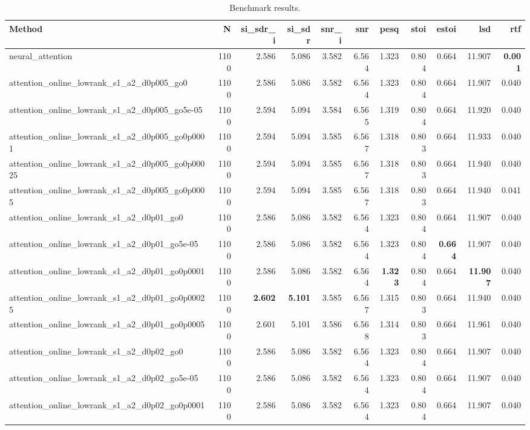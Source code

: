 \begin{table}[t]
\centering
\caption{Benchmark results.}
\label{tab:bench}
\begin{tabular}{lrrrrrrrrrr}
\toprule
Method & N & si\_sdr\_i & si\_sdr & snr\_i & snr & pesq & stoi & estoi & lsd & rtf \\
\midrule
neural_attention & 1100 & 2.586 & 5.086 & 3.582 & 6.564 & 1.323 & 0.804 & 0.664 & 11.907 & \textbf{0.001} \\
attention_online_lowrank_s1_a2_d0p005_go0 & 1100 & 2.586 & 5.086 & 3.582 & 6.564 & 1.323 & 0.804 & 0.664 & 11.907 & 0.040 \\
attention_online_lowrank_s1_a2_d0p005_go5e-05 & 1100 & 2.594 & 5.094 & 3.584 & 6.565 & 1.319 & 0.804 & 0.664 & 11.920 & 0.040 \\
attention_online_lowrank_s1_a2_d0p005_go0p0001 & 1100 & 2.594 & 5.094 & 3.585 & 6.567 & 1.318 & 0.803 & 0.664 & 11.933 & 0.040 \\
attention_online_lowrank_s1_a2_d0p005_go0p00025 & 1100 & 2.594 & 5.094 & 3.585 & 6.567 & 1.318 & 0.803 & 0.664 & 11.940 & 0.040 \\
attention_online_lowrank_s1_a2_d0p005_go0p0005 & 1100 & 2.594 & 5.094 & 3.585 & 6.567 & 1.318 & 0.803 & 0.664 & 11.940 & 0.041 \\
attention_online_lowrank_s1_a2_d0p01_go0 & 1100 & 2.586 & 5.086 & 3.582 & 6.564 & 1.323 & 0.804 & 0.664 & 11.907 & 0.040 \\
attention_online_lowrank_s1_a2_d0p01_go5e-05 & 1100 & 2.586 & 5.086 & 3.582 & 6.564 & 1.323 & 0.804 & \textbf{0.664} & 11.907 & 0.040 \\
attention_online_lowrank_s1_a2_d0p01_go0p0001 & 1100 & 2.586 & 5.086 & 3.582 & 6.564 & \textbf{1.323} & 0.804 & 0.664 & \textbf{11.907} & 0.040 \\
attention_online_lowrank_s1_a2_d0p01_go0p00025 & 1100 & \textbf{2.602} & \textbf{5.101} & 3.585 & 6.567 & 1.315 & 0.803 & 0.664 & 11.940 & 0.040 \\
attention_online_lowrank_s1_a2_d0p01_go0p0005 & 1100 & 2.601 & 5.101 & 3.586 & 6.568 & 1.314 & 0.803 & 0.664 & 11.961 & 0.040 \\
attention_online_lowrank_s1_a2_d0p02_go0 & 1100 & 2.586 & 5.086 & 3.582 & 6.564 & 1.323 & 0.804 & 0.664 & 11.907 & 0.040 \\
attention_online_lowrank_s1_a2_d0p02_go5e-05 & 1100 & 2.586 & 5.086 & 3.582 & 6.564 & 1.323 & 0.804 & 0.664 & 11.907 & 0.040 \\
attention_online_lowrank_s1_a2_d0p02_go0p0001 & 1100 & 2.586 & 5.086 & 3.582 & 6.564 & 1.323 & 0.804 & 0.664 & 11.907 & 0.040 \\

\end{tabular}
\end{table}
